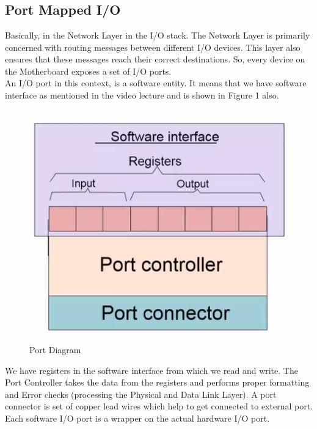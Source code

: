\documentclass[12pt]{article}
\begin{document}
\maketitle


\section{}
\subsection{Port Mapped I/O}
Basically, in the Network Layer in the I/O stack. The Network Layer is primarily concerned with routing messages between different I/O devices. This layer also ensures that these messages reach their correct destinations. So, every device on the Motherboard exposes a set of I/O ports. \\

An I/O port in this context, is a software entity. It means that we have software interface as mentioned in the video lecture and is shown in Figure 1 also.

\begin{figure}
    \centering
    \includegraphics[width=12cm, height=10cm]{Assignment-13/port_add.png}
    \caption{Port Diagram}
\end{figure}

We have registers in the software interface from which we read and write. The Port Controller takes the data from the registers and performs proper formatting and Error checks (processing the Physical and Data Link Layer). A port connector is set of copper lead wires which help to get connected to external port. Each software I/O port is a wrapper on the actual hardware I/O port. \\
\end{document}
